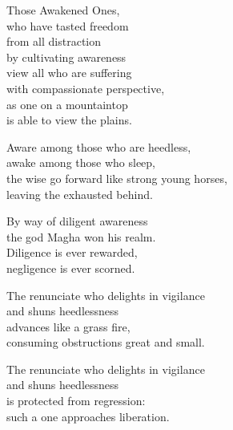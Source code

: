 Those Awakened Ones,\\
who have tasted freedom\\
from all distraction\\
by cultivating awareness\\
view all who are suffering\\
with compassionate perspective,\\
as one on a mountaintop\\
is able to view the plains.


Aware among those who are heedless,\\
awake among those who sleep,\\
the wise go forward like strong young horses,\\
leaving the exhausted behind.


By way of diligent awareness\\
the god Magha won his realm.\\
Diligence is ever rewarded,\\
negligence is ever scorned.


The renunciate who delights in vigilance\\
and shuns heedlessness\\
advances like a grass fire,\\
consuming obstructions great and small.


The renunciate who delights in vigilance\\
and shuns heedlessness\\
is protected from regression:\\
such a one approaches liberation.

